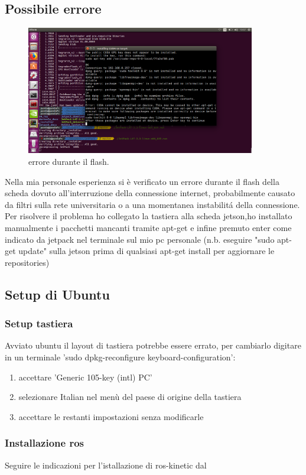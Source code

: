 \documentclass[a4paper]{article}
\begin{document}
\newpage
\subsection{Possibile errore}
\begin{figure}[h]
    \centering
    \includegraphics[width=10cm]{err1.png}    
    \caption{errore durante il flash.}
    \label{fig:err1}
\end{figure}
Nella mia personale esperienza si è verificato un errore durante il flash della scheda dovuto all'interruzione della connessione internet, probabilmente causato 
da filtri sulla rete universitaria o a una momentanea instabilitá della connessione. Per risolvere il problema ho collegato la tastiera alla scheda jetson,ho installato manualmente i pacchetti mancanti tramite apt-get e infine premuto enter come indicato da jetpack nel terminale sul mio pc personale (n.b. eseguire "sudo apt-get update" sulla jetson prima di qualsiasi apt-get install per aggiornare le repositories)

\subsection{Setup di Ubuntu}
\subsubsection{Setup tastiera}
Avviato ubuntu il layout di tastiera potrebbe essere errato, per cambiarlo digitare in un terminale 'sudo dpkg-reconfigure keyboard-configuration':
\begin{enumerate}
    \item accettare 'Generic 105-key (intl) PC'
    \item selezionare Italian nel menù del paese di origine della tastiera
    \item accettare le restanti impostazioni senza modificarle
\end{enumerate}
\subsubsection{Installazione ros}
Seguire le indicazioni per l'istallazione di ros-kinetic dal \href{http://wiki.ros.org/action/show/kinetic/Installation/Ubuntu?action=show&redirect=kinetic%2FInstallation%2FUbuntuARM}{\underline{\color{blue}{sito ufficiale per ubuntu ARM.}}}
\newpage
\end{document}
